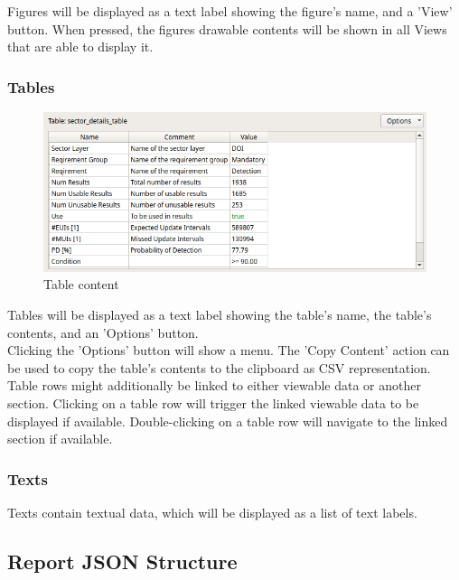 Figures will be displayed as a text label showing the figure's name, and a 'View' button. When pressed, the figures 
drawable contents will be shown in all Views that are able to display it.

\subsubsection{Tables} 
\label{sec:report_section_tables}

\begin{figure}[H]
    \hspace*{-2.5cm}
    \center
    \includegraphics[width=12cm,frame]{figures/content_table.png}
  \caption{Table content}
\end{figure}

Tables will be displayed as a text label showing the table's name, the table's contents, 
and an 'Options' button. \\

Clicking the 'Options' button will show a menu.
The 'Copy Content' action can be used to copy the table's contents to the clipboard as CSV representation. \\

Table rows might additionally be linked to either viewable data or another section.
Clicking on a table row will trigger the linked viewable data to be displayed if available.
Double-clicking on a table row will navigate to the linked section if available.

\subsubsection{Texts} 
\label{sec:report_section_texts}

Texts contain textual data, which will be displayed as a list of text labels. \\

\subsection{Report JSON Structure}
\label{sec:report_json_struct}

